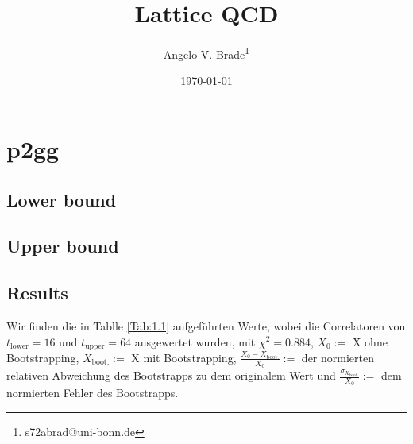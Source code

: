 \documentclass[10pt]{article}
\title{Lattice QCD}
\author[1]{Angelo V. Brade\thanks{s72abrad@uni-bonn.de}}
\affil[1]{Rheinische Friedrich-Wilhelms-Universität Bonn}
\date{\today}
\newenvironment{Figure}
  {\par\medskip\noindent\minipage{\linewidth}}
  {\endminipage\par\medskip}
\begin{document}
\maketitle
\newpage

\tableofcontents
\newpage


\pagestyle{fancy}
\fancyhead[R]{\thepage}
\fancyhead[L]{\leftmark}



\section{p2gg}
\subsection{Lower bound}
\begin{Figure}
  \centering\resizebox{\textwidth}{!}{}
  \label{fig:1.1}
\end{Figure}


\subsection{Upper bound}
\begin{Figure}
  \centering\resizebox{\textwidth}{!}{}
  \label{fig:1.2}

\subsection{Results}
\end{Figure}
\begin{Figure}
  \centering\resizebox{\textwidth}{!}{}
  \label{fig:1.3}
\end{Figure}

Wir finden die in Tablle \ref{Tab:1.1} aufgeführten Werte, wobei die Correlatoren von \(t_\text{lower}=16\) und \(t_\text{upper}=64\) ausgewertet wurden, mit \(\chi^2=0.884\), \(X_0:=\) X ohne Bootstrapping, \(X_\text{boot.}:=\) X mit Bootstrapping, \(\frac{X_0 - X_\text{boot.}}{X_0}:=\) der normierten relativen Abweichung des Bootstrapps zu dem originalem Wert und \(\frac{\sigma_{X_\text{boot.}}}{X_0}:=\) dem normierten Fehler des Bootstrapps.
\end{document}
